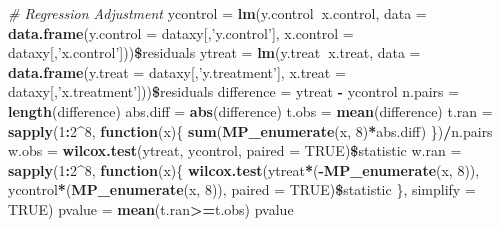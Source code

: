 \documentclass[]{article}
\newenvironment{Shaded}{\begin{snugshade}}{\end{snugshade}}
\newcommand{\KeywordTok}[1]{\textcolor[rgb]{0.13,0.29,0.53}{\textbf{#1}}}
\newcommand{\DataTypeTok}[1]{\textcolor[rgb]{0.13,0.29,0.53}{#1}}
\newcommand{\DecValTok}[1]{\textcolor[rgb]{0.00,0.00,0.81}{#1}}
\newcommand{\StringTok}[1]{\textcolor[rgb]{0.31,0.60,0.02}{#1}}
\newcommand{\CommentTok}[1]{\textcolor[rgb]{0.56,0.35,0.01}{\textit{#1}}}
\newcommand{\OtherTok}[1]{\textcolor[rgb]{0.56,0.35,0.01}{#1}}
\newcommand{\ControlFlowTok}[1]{\textcolor[rgb]{0.13,0.29,0.53}{\textbf{#1}}}
\newcommand{\OperatorTok}[1]{\textcolor[rgb]{0.81,0.36,0.00}{\textbf{#1}}}
\newcommand{\NormalTok}[1]{#1}
\begin{document}
\begin{Shaded}
\begin{Highlighting}[]
\CommentTok{# Regression Adjustment}
\NormalTok{ycontrol =}\StringTok{ }\KeywordTok{lm}\NormalTok{(y.control}\OperatorTok{~}\NormalTok{x.control, }\DataTypeTok{data =} \KeywordTok{data.frame}\NormalTok{(}\DataTypeTok{y.control =}\NormalTok{ dataxy[,}\StringTok{'y.control'}\NormalTok{], }\DataTypeTok{x.control =}\NormalTok{ dataxy[,}\StringTok{'x.control'}\NormalTok{]))}\OperatorTok{\$}\NormalTok{residuals}
\NormalTok{ytreat =}\StringTok{ }\KeywordTok{lm}\NormalTok{(y.treat}\OperatorTok{~}\NormalTok{x.treat, }\DataTypeTok{data =} \KeywordTok{data.frame}\NormalTok{(}\DataTypeTok{y.treat =}\NormalTok{ dataxy[,}\StringTok{'y.treatment'}\NormalTok{], }\DataTypeTok{x.treat =}\NormalTok{ dataxy[,}\StringTok{'x.treatment'}\NormalTok{]))}\OperatorTok{\$}\NormalTok{residuals}
\NormalTok{difference =}\StringTok{ }\NormalTok{ytreat }\OperatorTok{-}\StringTok{ }\NormalTok{ycontrol}
\NormalTok{n.pairs    =}\StringTok{ }\KeywordTok{length}\NormalTok{(difference)}
\NormalTok{abs.diff   =}\StringTok{ }\KeywordTok{abs}\NormalTok{(difference)}
\NormalTok{t.obs      =}\StringTok{ }\KeywordTok{mean}\NormalTok{(difference)}
\NormalTok{t.ran      =}\StringTok{ }\KeywordTok{sapply}\NormalTok{(}\DecValTok{1}\OperatorTok{:}\DecValTok{2}\OperatorTok{^}\DecValTok{8}\NormalTok{, }
                    \ControlFlowTok{function}\NormalTok{(x)\{ }
                      \KeywordTok{sum}\NormalTok{(}\KeywordTok{MP_enumerate}\NormalTok{(x, }\DecValTok{8}\NormalTok{)}\OperatorTok{*}\NormalTok{abs.diff) }
\NormalTok{                      \})}\OperatorTok{/}\NormalTok{n.pairs}
\NormalTok{w.obs =}\StringTok{ }\KeywordTok{wilcox.test}\NormalTok{(ytreat, ycontrol, }\DataTypeTok{paired =} \OtherTok{TRUE}\NormalTok{)}\OperatorTok{\$}\NormalTok{statistic}
\NormalTok{w.ran      =}\StringTok{ }\KeywordTok{sapply}\NormalTok{(}\DecValTok{1}\OperatorTok{:}\DecValTok{2}\OperatorTok{^}\DecValTok{8}\NormalTok{, }
                    \ControlFlowTok{function}\NormalTok{(x)\{ }
                      \KeywordTok{wilcox.test}\NormalTok{(ytreat}\OperatorTok{*}\NormalTok{(}\OperatorTok{-}\KeywordTok{MP_enumerate}\NormalTok{(x, }\DecValTok{8}\NormalTok{)), ycontrol}\OperatorTok{*}\NormalTok{(}\KeywordTok{MP_enumerate}\NormalTok{(x, }\DecValTok{8}\NormalTok{)), }\DataTypeTok{paired =} \OtherTok{TRUE}\NormalTok{)}\OperatorTok{\$}\NormalTok{statistic}
\NormalTok{                      \}, }\DataTypeTok{simplify =} \OtherTok{TRUE}\NormalTok{)}
\NormalTok{pvalue     =}\StringTok{ }\KeywordTok{mean}\NormalTok{(t.ran}\OperatorTok{>=}\NormalTok{t.obs)}
\NormalTok{pvalue}
\end{Highlighting}
\end{Shaded}
\end{document}
